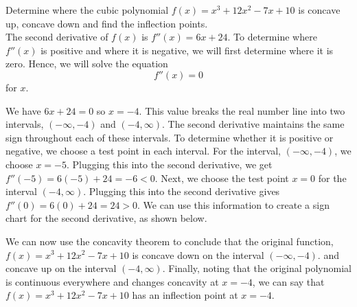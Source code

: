 \documentclass[handout]{ximera}
\begin{document}
\begin{example}[example 4]
Determine where the cubic polynomial $f(x) = x^3 + 12x^2 - 7x + 10$ is concave up, 
concave down and find the inflection points.\\
The second derivative of $f(x)$ is 
$f''(x) = 6x + 24$.  To determine where $f''(x)$ is positive and where it is negative, 
we will first determine where it is zero. Hence, we will solve the equation
\[f''(x) = 0\]
for $x$.

We have $6x + 24 = 0$ so $x = -4$.
This value breaks the real number line into two intervals, $(-\infty, -4)$ and $(-4, \infty)$.
The second derivative maintains the same sign throughout each of these intervals.  
To determine whether it is positive or negative, we choose a test point in each interval.
For the interval, $(-\infty, -4)$, we choose $x = -5$.  
Plugging this into the second derivative, we get
$f''(-5) = 6(-5) + 24 = -6 < 0$. Next, we choose the test point 
$x = 0$ for the interval $(-4, \infty)$.  Plugging this into the second 
derivative gives $f''(0) = 6(0) + 24 = 24 > 0$.
We can use this information to create a sign chart for the second derivative, as shown below.




\begin{image}
\end{image}


We can now use the concavity theorem to conclude that
the original function,
$f(x) = x^3 + 12x^2 - 7x +10$ is concave down on the interval $(-\infty, -4)$.
and concave up on the interval $(-4, \infty)$.
Finally, noting that the original polynomial is continuous everywhere and changes 
concavity at $x = -4$, we can say that
$f(x) = x^3 + 12x^2 - 7x +10$ has an inflection point at $x = -4$.


\end{example}
\end{document}
